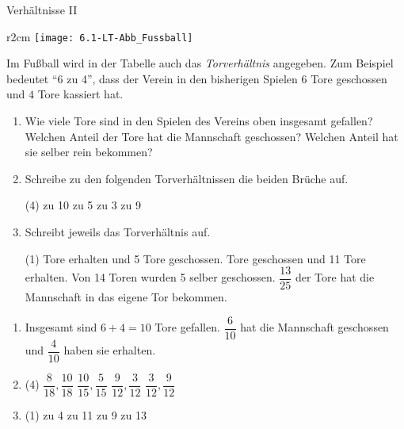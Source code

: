 \documentclass[12pt,a5paper,landscape]{scrartcl}
\begin{document}
	\begin{karte2}[\symPartner]{Verhältnisse II}
		\begin{wrapfig}
		\begin{wrapfigure}{r}{2cm}
			\texttt{[image: 6.1-LT-Abb\_Fussball]}
		\end{wrapfigure}
		Im Fußball wird in der Tabelle auch das \emph{Torverhältnis} angegeben. Zum Beispiel bedeutet \enquote{6 zu 4}, dass der Verein in den bisherigen Spielen $6$ Tore geschossen und $4$ Tore kassiert hat.
		\end{wrapfig}\vspace{-.8em}
		
		\begin{enumerate}\small
			\item Wie viele Tore sind in den Spielen des Vereins oben insgesamt gefallen? Welchen Anteil der Tore hat die Mannschaft geschossen? Welchen Anteil hat sie selber rein bekommen?
			\item Schreibe zu den folgenden Torverhältnissen die beiden Brüche auf.
				\begin{tasks}(4)
					 zu 10
					 zu 5
					 zu 3
					 zu 9
				\end{tasks}
			\item Schreibt jeweils das Torverhältnis auf.
				\begin{tasks}(1)
					 Tore erhalten und 5 Tore geschossen.
					 Tore geschossen und 11 Tore erhalten.
					\task Von 14 Toren wurden 5 selber geschossen.
					\task $\dfrac{13}{25}$ der Tore hat die Mannschaft in das eigene Tor bekommen.
				\end{tasks}
		\end{enumerate}
	\end{karte2}
	
	\begin{loesungskarte}
		\begin{enumerate}
			\item Insgesamt sind $6+4=10$ Tore gefallen. $\dfrac{6}{10}$ hat die Mannschaft geschossen und $\dfrac{4}{10}$ haben sie erhalten.
			
			\item\begin{tasks}(4)
				\task $\dfrac{8}{18}, \dfrac{10}{18}$
				\task $\dfrac{10}{15}, \dfrac{5}{15}$
				\task $\dfrac{9}{12}, \dfrac{3}{12}$
				\task $\dfrac{3}{12}, \dfrac{9}{12}$
			\end{tasks}
				
			\item\begin{tasks}(1)
				\task 5 zu 4
				\task 2 zu 11
				\task 5 zu 9
				\task 12 zu 13
			\end{tasks}
		\end{enumerate}
	\end{loesungskarte}
\end{document}
